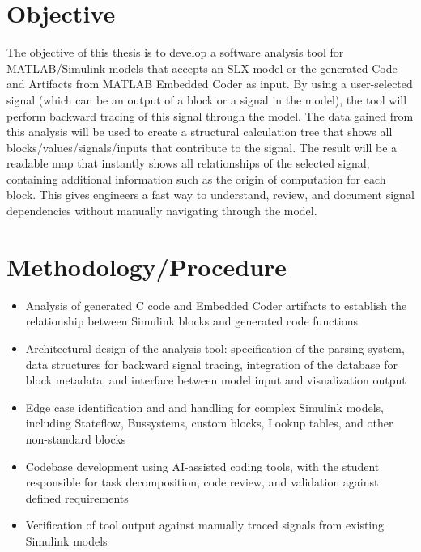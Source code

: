 \documentclass[a4paper,12pt]{report}
\begin{document}

\section{Objective}

The objective of this thesis is to develop a software analysis tool for MATLAB/Simulink models
that accepts an SLX model or the generated Code and Artifacts from MATLAB Embedded Coder as input.
By using a user-selected signal (which can be an output of a block or a signal in the model), 
the tool will perform backward tracing of this signal through the model.
The data gained from this analysis will be used to create a structural calculation tree that shows
all blocks/values/signals/inputs that contribute to the signal.
The result will be a readable map that instantly shows all relationships of the selected signal, 
containing additional information such as the origin of computation for each block.
This gives engineers a fast way to understand, review, and document signal dependencies 
without manually navigating through the model.


\section{Methodology/Procedure}
\begin{itemize}
  \setlength{\itemsep}{0.05em}
  \item Analysis of generated C code and Embedded Coder artifacts to establish
        the relationship between Simulink blocks and generated code functions
  \item Architectural design of the analysis tool: specification of the parsing system,
        data structures for backward signal tracing, integration of the database for block metadata, 
        and interface between model input and visualization output
  \item Edge case identification and and handling for complex Simulink models, 
        including Stateflow, Bussystems, custom blocks, Lookup tables, and other non-standard blocks
  \item Codebase development using AI-assisted coding tools, with the
        student responsible for task decomposition, code review, and
        validation against defined requirements
  \item Verification of tool output against manually traced signals
        from existing Simulink models
\end{itemize}
\end{document}
